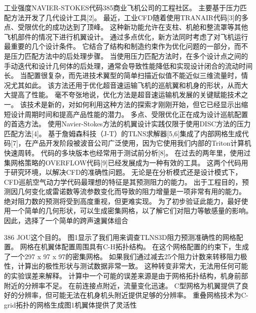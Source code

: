 \documentclass[UTF8,11pt,a4paper,openany,fontset=fandol]{ctexbook}
\begin{document}
工业强度NAVIER-STOKES代码385商业飞机公司的工程社区。 主要基于压力匹配方法开发了几代设计工具[2]。 最近，工业CFD随着使用TRANAIR代码[3]的多点、受限优化的成功达到了顶峰。 这种新功能允许在支柱、机舱和整流罩等其他飞机部件的情况下进行机翼设计。 通过多点优化，新方法同时考虑了对飞机运行最重要的几个设计条件。 它结合了结构和制造约束作为优化问题的一部分，而不是压力匹配方法中的后处理步骤。 当使用压力匹配方法时，在多个设计点之间的手动迭代和设计几何体的后处理，通常会导致性能降低和实现设计闭合的流动时间长。 当配置很复杂，而先进技术翼型的简单扫描近似值不能近似三维流量时，情况尤其如此。 该方法还用于优化超音速运输飞机的巡航翼和机身的形状，从而大大提高了性能。 毫不夸张地说，优化方法是超音速运输机发展的关键赋能技术之一。 该技术是新的，对如何利用这种方法的探索才刚刚开始，但它已经显示出缩短设计周期时间和提高产品性能的潜力。 多点、受限优化正在成为设计巡航配置的首选方法。 使用Navier-Stokes方法的机翼设计实践仅限于使用DISC方法的压力匹配方法[4]。 基于詹姆森科技（J-T）的TLNS求解器[5,6]集成了内部网格生成代码[7]，在产品开发阶段被波音公司广泛使用，因为它使用我们内部的Triton计算机快速周转。 代码的多块版本也经常用于测试前分析[8]。 在过去的两年里，使用过集网格策略的OVERFLOW代码[9]已经发展成为一种有效的工具。 这两个代码用于研究环境，以解决CFD的准确性问题。 无论是在分析模式还是设计模式下，CFD巡航空气动力学代码最理想的特征是其预测阻力的能力。 出于工程目的，预测因几何变化或雷诺数等流参数变化而导致的阻力增量是一项非常有用的能力。 绝对阻力数的预测将受到高度重视，但更难实现。 为了初步验证此能力，最好使用一个简单的几何形状，可以生成密集网格，以了解它们对阻力等敏感量的影响。 因此，选择了一个简单的跨声速翼体组合

386 JOU这个目的。 图1显示了我们用来调查TLNS3D阻力预测准确性的网格配置。 网格在机翼体配置周围具有C-H拓扑结构。 在这个网格配置的约束下，生成了一个297 x 97 x 97的密集网格。 如果我们通过减去25个阻力计数来转移阻力极性，计算出的极性形状与测试数据非常一致。 这种转变非常大，无法用任何可能的实验误差来解释。 计算中一个可能的误差来源是由于网格拓扑结构，机身前部附近的分辨率不足。 在前连接点附近，流量变化迅速。 C型网格为机翼提供了良好的分辨率，但可能无法在机身机头附近提供足够的分辨率。 重叠网格技术为C-grid拓扑的网格生成图1机翼体提供了灵活性
\end{document}

